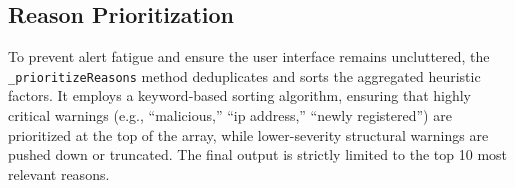 \subsection{Reason Prioritization}\label{reason-prioritization}

To prevent alert fatigue and ensure the user interface remains
uncluttered, the \texttt{\_prioritizeReasons} method deduplicates and
sorts the aggregated heuristic factors. It employs a keyword-based
sorting algorithm, ensuring that highly critical warnings (e.g.,
``malicious,'' ``ip address,'' ``newly registered'') are prioritized at
the top of the array, while lower-severity structural warnings are
pushed down or truncated. The final output is strictly limited to the
top 10 most relevant reasons.

